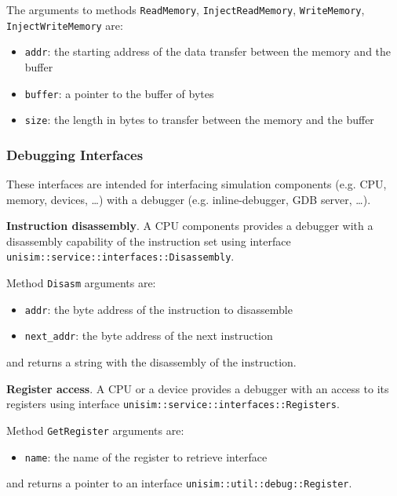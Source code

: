 \begin{center}
	
\end{center}

\noindent The arguments to methods \texttt{ReadMemory}, \texttt{InjectReadMemory}, \texttt{WriteMemory}, \texttt{InjectWriteMemory} are:
\begin{itemize}
\item \texttt{addr}: the starting address of the data transfer between the memory and the buffer
\item \texttt{buffer}: a pointer to the buffer of bytes
\item \texttt{size}: the length in bytes to transfer between the memory and the buffer
\end{itemize}

\subsubsection{Debugging Interfaces}

These interfaces are intended for interfacing simulation components (e.g. CPU, memory, devices, \ldots) with a debugger (e.g. inline-debugger, GDB server, \ldots).

\textbf{Instruction disassembly}. A CPU components provides a debugger with a disassembly capability of the instruction set using interface \texttt{unisim::service::interfaces::Disassembly}.

\begin{center}
	
\end{center}

\noindent Method \texttt{Disasm} arguments are:
\begin{itemize}
\item \texttt{addr}: the byte address of the instruction to disassemble
\item \texttt{next\_addr}: the byte address of the next instruction
\end{itemize}
\noindent and returns a string with the disassembly of the instruction.

\textbf{Register access}. A CPU or a device provides a debugger with an access to its registers using interface \texttt{unisim::service::interfaces::Registers}.

\begin{center}
	
\end{center}

\noindent Method \texttt{GetRegister} arguments are:
\begin{itemize}
\item \texttt{name}: the name of the register to retrieve interface
\end{itemize}
\noindent and returns a pointer to an interface \texttt{unisim::util::debug::Register}.

